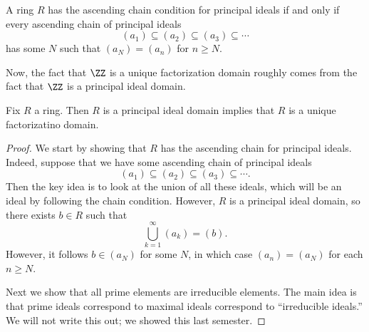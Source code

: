 \begin{example}
	A ring $R$ has the ascending chain condition for principal ideals if and only if every ascending chain of principal ideals
	\[(a_1)\subseteq (a_2)\subseteq(a_3)\subseteq\cdots\]
	has some $N$ such that $(a_N)=(a_n)$ for $n\ge N$.
\end{example}
Now, the fact that $\ZZ$ is a unique factorization domain roughly comes from the fact that $\ZZ$ is a principal ideal domain.
\begin{theorem}
	Fix $R$ a ring. Then $R$ is a principal ideal domain implies that $R$ is a unique factorizatino domain.
\end{theorem}
\begin{proof}
	We start by showing that $R$ has the ascending chain for principal ideals. Indeed, suppose that we have some ascending chain of principal ideals
	\[(a_1)\subseteq (a_2)\subseteq(a_3)\subseteq\cdots.\]
	Then the key idea is to look at the union of all these ideals, which will be an ideal by following the chain condition. However, $R$ is a principal ideal domain, so there exists $b\in R$ such that
	\[\bigcup_{k=1}^\infty(a_k)=(b).\]
	However, it follows $b\in(a_N)$ for some $N$, in which case $(a_n)=(a_N)$ for each $n\ge N$.

	Next we show that all prime elements are irreducible elements. The main idea is that prime ideals correspond to maximal ideals correspond to ``irreducible ideals.'' We will not write this out; we showed this last semester.
\end{proof}

